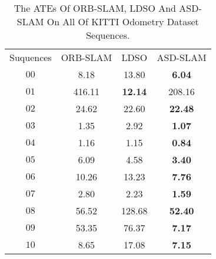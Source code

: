\documentclass[letterpaper, 10 pt, conference]{ieeeconf}  %
\begin{document}
\begin{table}[h]
\caption{The ATEs Of ORB-SLAM, LDSO And ASD-SLAM On All Of KITTI Odometry Dataset Sequences.}
\begin{center}
\begin{tabular}{cccc}
\toprule
\hline
\multirow{1}{*}{Suquences} & \multicolumn{1}{c}{ORB-SLAM} & \multicolumn{1}{c}{LDSO} & \multicolumn{1}{c}{ASD-SLAM} \\
$00 $             &8.18                      & 13.80                    & \textbf{6.04}                   \\
$01 $             &416.11                          &\textbf{12.14}                   & 208.16                   \\
$02 $             &24.62                          & 22.60                    & \textbf{22.48}                   \\
$03 $             &1.35                         & 2.92                    & \textbf{1.07}                   \\
$04 $             &1.16                          &1.15                    & \textbf{0.84}                   \\
$05 $             &6.09                          & 4.58                 & \textbf{3.40}                   \\
$06 $             &10.26                          & 13.23                    & \textbf{7.76}                   \\
$07 $             &2.80                          & 2.23                   & \textbf{1.59}                 \\
$08 $             &56.52                         &128.68                   &\textbf{52.40}                   \\
$09 $             &53.35                        & 76.37                   &\textbf{7.17}                  \\
$10 $             &8.65                         &17.08                    & \textbf{7.15}                 \\
\hline
\hline
\toprule
\end{tabular} 
\end{center}
\end{table}\vspace{1.3in}
\end{document}
